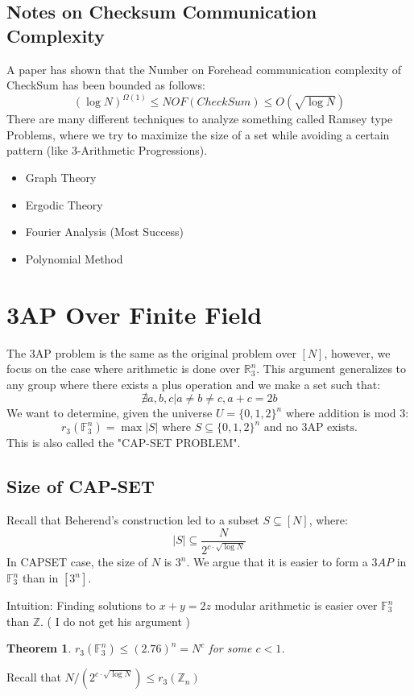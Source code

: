 \documentclass[11pt]{article}
\newtheorem{theorem}{Theorem}[section]
\theoremstyle{definition}
\begin{document}
\subsection{Notes on Checksum Communication Complexity}
A paper has shown that the Number on Forehead communication complexity of CheckSum has been bounded as follows:
$$(\log N)^{\Omega(1)} \leq NOF(CheckSum) \leq O(\sqrt{\log N})$$
There are many different techniques to analyze something called Ramsey type Problems, where we try to maximize the size of a set while avoiding a certain pattern (like 3-Arithmetic Progressions).
\begin{itemize}
    \item Graph Theory
    \item Ergodic Theory
    \item Fourier Analysis (Most Success)
    \item Polynomial Method
\end{itemize}
\section{3AP Over Finite Field}
The 3AP problem is the same as the original problem over $[N]$, however, we focus on the case where arithmetic is done over $\mathbb{R}_3^n$. This argument generalizes to any group where there exists a plus operation and we make a set such that:
$$\nexists a,b,c | a \neq b \neq c, a + c = 2b$$
We want to determine, given the universe $U = \{0,1,2\}^n$ where addition is mod 3:
$$r_3(\mathbb{F}_3^n) = \max |S| \text{ where } S \subseteq \{0,1,2\}^n\text{ and no 3AP exists.}$$
This is also called the "CAP-SET PROBLEM".
\subsection{Size of CAP-SET}
Recall that Beherend's construction led to a subset $S \subseteq [N]$, where:
$$|S| \subseteq \frac{N}{2^{c\cdot \sqrt{\log N}}}$$
In CAPSET case, the size of $N$ is $3^n$. We argue that it is easier to form a $3AP$ in $\mathbb{F}^n_3$ than in $[3^n]$.
\bigskip

Intuition: Finding solutions to $x+y = 2z$ modular arithmetic is easier over $\mathbb{F}_3^n$ than $\mathbb{Z}$. ( I do not get his argument )

\begin{theorem}
    $r_3(\mathbb{F}_3^n) \leq (2.76)^n = N^c$ for some $c < 1$.
\end{theorem}
Recall that $N/(2^{c\cdot \sqrt{\log N}}) \leq r_3(\mathbb{Z}_n)$
\bigskip
\end{document}
